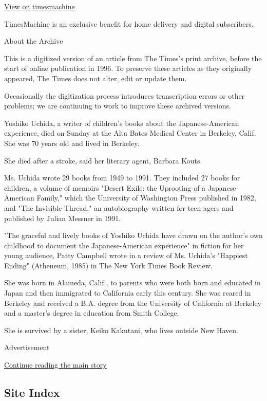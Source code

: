 \href{http://timesmachine.nytimes3xbfgragh.onion/timesmachine/1992/06/24/280492.html}{View
on timesmachine}

TimesMachine is an exclusive benefit for home delivery and digital
subscribers.

About the Archive

This is a digitized version of an article from The Times's print
archive, before the start of online publication in 1996. To preserve
these articles as they originally appeared, The Times does not alter,
edit or update them.

Occasionally the digitization process introduces transcription errors or
other problems; we are continuing to work to improve these archived
versions.

Yoshiko Uchida, a writer of children's books about the Japanese-American
experience, died on Sunday at the Alta Bates Medical Center in Berkeley,
Calif. She was 70 years old and lived in Berkeley.

She died after a stroke, said her literary agent, Barbara Kouts.

Ms. Uchida wrote 29 books from 1949 to 1991. They included 27 books for
children, a volume of memoirs "Desert Exile: the Uprooting of a
Japanese-American Family," which the University of Washington Press
published in 1982, and "The Invisible Thread," an autobiography written
for teen-agers and published by Julian Messner in 1991.

"The graceful and lively books of Yoshiko Uchida have drawn on the
author's own childhood to document the Japanese-American experience" in
fiction for her young audience, Patty Campbell wrote in a review of Ms.
Uchida's "Happiest Ending" (Atheneum, 1985) in The New York Times Book
Review.

She was born in Alameda, Calif., to parents who were both born and
educated in Japan and then immigrated to California early this century.
She was reared in Berkeley and received a B.A. degree from the
University of California at Berkeley and a master's degree in education
from Smith College.

She is survived by a sister, Keiko Kakutani, who lives outside New
Haven.

Advertisement

\protect\hyperlink{after-bottom}{Continue reading the main story}

\hypertarget{site-index}{%
\subsection{Site Index}\label{site-index}}

